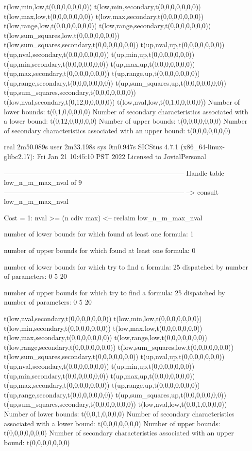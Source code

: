 t(low,min,low,t(0,0,0,0,0,0,0))
t(low,min,secondary,t(0,0,0,0,0,0,0))
t(low,max,low,t(0,0,0,0,0,0,0))
t(low,max,secondary,t(0,0,0,0,0,0,0))
t(low,range,low,t(0,0,0,0,0,0,0))
t(low,range,secondary,t(0,0,0,0,0,0,0))
t(low,sum_squares,low,t(0,0,0,0,0,0,0))
t(low,sum_squares,secondary,t(0,0,0,0,0,0,0))
t(up,nval,up,t(0,0,0,0,0,0,0))
t(up,nval,secondary,t(0,0,0,0,0,0,0))
t(up,min,up,t(0,0,0,0,0,0,0))
t(up,min,secondary,t(0,0,0,0,0,0,0))
t(up,max,up,t(0,0,0,0,0,0,0))
t(up,max,secondary,t(0,0,0,0,0,0,0))
t(up,range,up,t(0,0,0,0,0,0,0))
t(up,range,secondary,t(0,0,0,0,0,0,0))
t(up,sum_squares,up,t(0,0,0,0,0,0,0))
t(up,sum_squares,secondary,t(0,0,0,0,0,0,0))
t(low,nval,secondary,t(0,12,0,0,0,0,0))
t(low,nval,low,t(0,1,0,0,0,0,0))
Number of lower bounds:                                             t(0,1,0,0,0,0,0)
Number of secondary characteristics associated with a lower bound:  t(0,12,0,0,0,0,0)
Number of upper bounds:                                             t(0,0,0,0,0,0,0)
Number of secondary characteristics associated with an upper bound: t(0,0,0,0,0,0,0)

real	2m50.089s
user	2m33.198s
sys	0m0.947s
SICStus 4.7.1 (x86_64-linux-glibc2.17): Fri Jan 21 10:45:10 PST 2022
Licensed to JovialPersonal


--------------------------------------------------------------------------------
Handle table low_n_m_max_nval of 9
--------------------------------------------------------------------------------
--> consult low_n_m_max_nval

Cost =  1:  nval >= (n cdiv max)
<-- reclaim low_n_m_max_nval

number of lower bounds for which found at least one formula: 1

number of upper bounds for which found at least one formula: 0

number of lower bounds for which try to find a formula: 25
dispatched by number of parameters: 0  5  20

number of upper bounds for which try to find a formula: 25
dispatched by number of parameters: 0  5  20

t(low,nval,secondary,t(0,0,0,0,0,0,0))
t(low,min,low,t(0,0,0,0,0,0,0))
t(low,min,secondary,t(0,0,0,0,0,0,0))
t(low,max,low,t(0,0,0,0,0,0,0))
t(low,max,secondary,t(0,0,0,0,0,0,0))
t(low,range,low,t(0,0,0,0,0,0,0))
t(low,range,secondary,t(0,0,0,0,0,0,0))
t(low,sum_squares,low,t(0,0,0,0,0,0,0))
t(low,sum_squares,secondary,t(0,0,0,0,0,0,0))
t(up,nval,up,t(0,0,0,0,0,0,0))
t(up,nval,secondary,t(0,0,0,0,0,0,0))
t(up,min,up,t(0,0,0,0,0,0,0))
t(up,min,secondary,t(0,0,0,0,0,0,0))
t(up,max,up,t(0,0,0,0,0,0,0))
t(up,max,secondary,t(0,0,0,0,0,0,0))
t(up,range,up,t(0,0,0,0,0,0,0))
t(up,range,secondary,t(0,0,0,0,0,0,0))
t(up,sum_squares,up,t(0,0,0,0,0,0,0))
t(up,sum_squares,secondary,t(0,0,0,0,0,0,0))
t(low,nval,low,t(0,0,1,0,0,0,0))
Number of lower bounds:                                             t(0,0,1,0,0,0,0)
Number of secondary characteristics associated with a lower bound:  t(0,0,0,0,0,0,0)
Number of upper bounds:                                             t(0,0,0,0,0,0,0)
Number of secondary characteristics associated with an upper bound: t(0,0,0,0,0,0,0)

